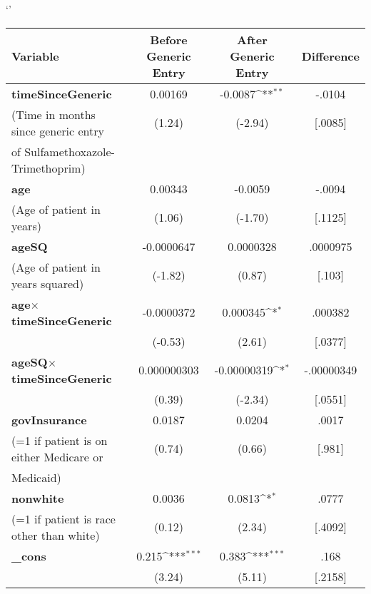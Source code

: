 \def\sym#1{\ifmmode^{#1}\else\(^{#1}\)\fi}`'
\begin{tabular}{l*{3}{c}}
\hline\hline
Variable            &\multicolumn{1}{c}{Before Generic Entry}&\multicolumn{1}{c}{After Generic Entry}&\multicolumn{1}{c}{Difference}\\
\hline
\textbf{timeSinceGeneric}&                            0.00169         &     -0.0087\sym{**} & -.0104\\
(Time in months since generic entry            &      (1.24)         &     (-2.94) & [.0085]\\
of Sulfamethoxazole-Trimethoprim)\\
[1em]
\textbf{age}         &                      0.00343         &    -0.0059 & -.0094\\
(Age of patient in years)            &      (1.06)         &     (-1.70) & [.1125]\\
[1em]
\textbf{ageSQ}       &                             -0.0000647         &   0.0000328 & .0000975\\
(Age of patient in years squared)            &     (-1.82)         &      (0.87) & [.103]\\
[1em]
\textbf{age}$\times$\textbf{timeSinceGeneric}      &  -0.0000372         &    0.000345\sym{*}& .000382 \\
            &                                          (-0.53)         &      (2.61)         & [.0377]\\
[1em]
\textbf{ageSQ}$\times$\textbf{timeSinceGeneric}    & 0.000000303         & -0.00000319\sym{*}  & -.00000349\\
            &                                        (0.39)         &     (-2.34)         & [.0551]\\
[1em]
\textbf{govInsurance}&                                    0.0187         &      0.0204         & .0017\\
(=1 if patient is on either Medicare or            &      (0.74)         &      (0.66)         & [.981]\\
Medicaid)\\
[1em]
\textbf{nonwhite}    &                                     0.0036         &      0.0813\sym{*}  & .0777\\
(=1 if patient is race other than white)            &      (0.12)         &      (2.34)         & [.4092]\\
[1em]
\textbf{\_cons}      &       0.215\sym{***}&       0.383\sym{***} & .168\\
            &                (3.24)         &      (5.11)         & [.2158] \\

\end{tabular}
